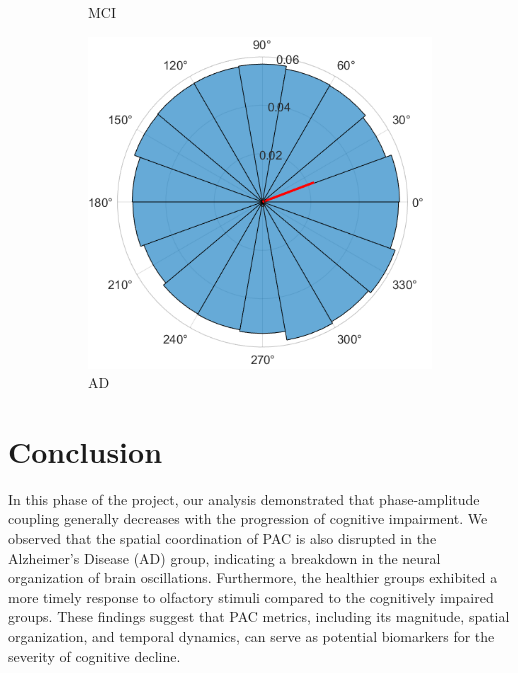 \documentclass[hidelinks,12pt]{article}
\begin{document}
\begin{figure}[bh!]
\begin{subfigure}[b]{0.3\textwidth}
			\caption{MCI}
		\end{subfigure}
		\hfill
		\begin{subfigure}[b]{0.3\textwidth}
			\centering
			\includegraphics[width=\textwidth]{18}
			\caption{AD}
		\end{subfigure}
		
		\caption{}
	\end{figure}
	
	\newpage

	\section{Conclusion}
	In this phase of the project, our analysis demonstrated that phase-amplitude coupling generally decreases with the progression of cognitive impairment. We observed that the spatial coordination of PAC is also disrupted in the Alzheimer's Disease (AD) group, indicating a breakdown in the neural organization of brain oscillations. Furthermore, the healthier groups exhibited a more timely response to olfactory stimuli compared to the cognitively impaired groups. These findings suggest that PAC metrics, including its magnitude, spatial organization, and temporal dynamics, can serve as potential biomarkers for the severity of cognitive decline.
	
\end{document}
